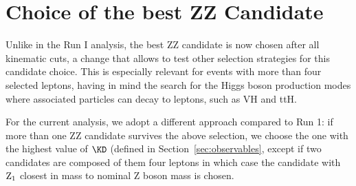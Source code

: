 \section{Choice of the best ZZ Candidate}
\label{sec:zzbestcand}

Unlike in the Run I analysis, the best ZZ candidate is now chosen after all kinematic cuts, a change that allows to test other selection strategies for this candidate choice. 
This is especially relevant for events with more than four selected leptons, having in mind the search for the Higgs boson production modes where associated particles can decay to leptons, such as VH and ttH.

For the current analysis, we adopt a different approach compared to Run 1: if more than one ZZ candidate survives the above selection,
we choose the one with the highest value of $\KD$ (defined in Section~\ref{sec:observables}, except if
two candidates are composed of them four leptons in which case the candidate with ${\rm Z_1}$ closest in mass to nominal 
Z boson mass is chosen.


